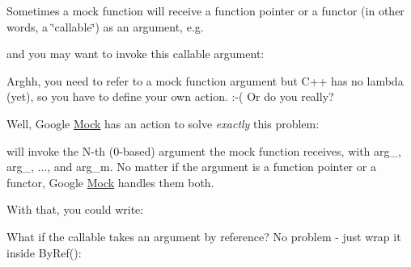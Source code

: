 Sometimes a mock function will receive a function pointer or a functor (in other words, a \char`\"{}callable\char`\"{}) as an argument, e.\+g.


\begin{DoxyCode}{0}
\DoxyCodeLine{\};}
\end{DoxyCode}


and you may want to invoke this callable argument\+:


\begin{DoxyCode}{0}
\end{DoxyCode}


Arghh, you need to refer to a mock function argument but C++ has no lambda (yet), so you have to define your own action. \+:-\/( Or do you really?

Well, Google \mbox{\hyperlink{class_mock}{Mock}} has an action to solve {\itshape exactly} this problem\+:


\begin{DoxyCode}{0}
\end{DoxyCode}


will invoke the {\ttfamily N}-\/th (0-\/based) argument the mock function receives, with {\ttfamily arg\+\_}, {\ttfamily arg\+\_}, ..., and {\ttfamily arg\+\_\+m}. No matter if the argument is a function pointer or a functor, Google \mbox{\hyperlink{class_mock}{Mock}} handles them both.

With that, you could write\+:


\begin{DoxyCode}{0}
\end{DoxyCode}


What if the callable takes an argument by reference? No problem -\/ just wrap it inside {\ttfamily By\+Ref()}\+:


